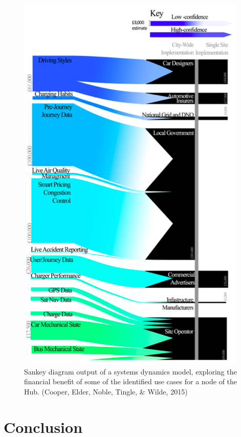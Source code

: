 \documentclass[journal]{IEEEtran}
\begin{document}
\begin{figure}[!htb]
\centering
\includegraphics[width=\columnwidth]{images/sankey.png}
\caption{Sankey diagram output of a systems dynamics model, exploring
  the financial benefit of some of the identified use cases for a node
  of the Hub. (Cooper, Elder, Noble, Tingle, \& Wilde, 2015)}
\label{fig:sankey}
\end{figure}



\section{Conclusion}\label{conclusion}
\end{document}
